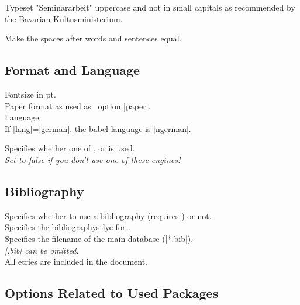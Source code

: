 Typeset "Seminararbeit" uppercase and not in small capitals as recommended
by the Bavarian Kultusministerium.

Make the spaces after words and sentences equal.



\subsection{Format and Language}

Fontsize in pt. \\

Paper format as used as \report\ option |paper|. \\

Language. \\ If |lang|=|german|, the babel language is |ngerman|.

Specifies whether one of ,  or  is used. \\
\emph{Set to false if you don't use one of these engines!}



\subsection{Bibliography}

Specifies whether to use a bibliography (requires ) or not. \\

Specifies the bibliographystlye for . \\

Specifies the filename of the main  database (|*.bib|). \\
\emph{|.bib| can be omitted.} \\
All etries are included in the document.



\subsection{Options Related to Used Packages}

